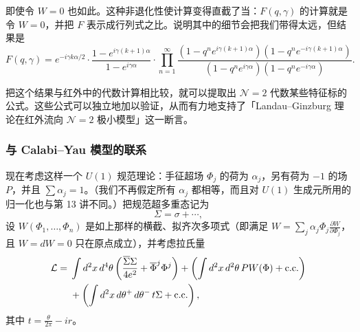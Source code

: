 
即使令 $W=0$ 也如此。这种非退化性使计算变得直截了当：$F(q,\gamma)$ 的计算就是令 $W=0$，并把 $F$ 表示成行列式之比。说明其中的细节会把我们带得太远，但结果是
\[
  F(q,\gamma)=e^{-i\gamma k\alpha/2}\cdot
  \frac{1-e^{i\gamma(k+1)\alpha}}{1-e^{i\gamma\alpha}}\cdot
  \prod_{n=1}^{\infty}
  \frac{\left(1-q^ne^{i\gamma(k+1)\alpha}\right)\left(1-q^ne^{-i\gamma(k+1)\alpha}\right)}
  {\left(1-q^ne^{i\gamma\alpha}\right)\left(1-q^ne^{-i\gamma\alpha}\right)} .
\]

把这个结果与红外中的代数计算相比较，就可以提取出 $\mathcal{N}=2$ 代数某些特征标的公式。这些公式可以独立地加以验证，从而有力地支持了「Landau--Ginzburg 理论在红外流向 $\mathcal{N}=2$ 极小模型」这一断言。


\subsubsection{与 Calabi--Yau 模型的联系}

现在考虑这样一个 $U(1)$ 规范理论：手征超场 $\Phi_j$ 的荷为 $\alpha_j$，另有荷为 $-1$ 的场 $P$，并且 $\sum\alpha_j=1$。（我们不再假定所有 $\alpha_j$ 都相等，而且对 $U(1)$ 生成元所用的归一化也与第 13 讲不同。）把规范超多重态记为
\[
  \Sigma=\sigma+\cdots,
\]
设 $W(\Phi_1,\dots,\Phi_n)$ 是如上那样的横截、拟齐次多项式（即满足 $W=\sum_j\alpha_j\Phi_j\frac{\partial W}{\partial\Phi_j}$，且 $W=dW=0$ 只在原点成立），并考虑拉氏量
\[
  \begin{aligned}
  \mathcal{L}={}&\int d^2x\,d^4\theta\left(
  \frac{\overline{\Sigma}\Sigma}{4e^2}+\overline{\Phi}^j\Phi^j\right)
  +\left(\int d^2x\,d^2\theta\,PW(\Phi)+{\rm c.c.}\right)\\
  &+\left(\int d^2x\,d\theta^+\,d\theta^-\,t\Sigma+{\rm c.c.}\right),
  \end{aligned}
\]
其中 $t=\frac{\theta}{2\pi}-ir$。

